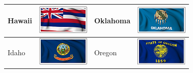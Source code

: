 \documentclass{ximera}
\begin{document}
\begin{center}
\begin{tabular}{|l|l|l|l|}
Hawaii & \includegraphics{pics/StateFlags/Hawaii.png} & Oklahoma & \includegraphics{pics/StateFlags/Oklahoma.png} \\\hline 
Idaho & \includegraphics{pics/StateFlags/Idaho.png} & Oregon & \includegraphics{pics/StateFlags/Oregon.png} \\\hline 
\end{tabular}




\end{center}
\end{document}
